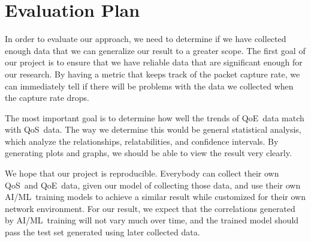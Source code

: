 \section{Evaluation Plan}\label{evaluation}
    In order to evaluate our approach, we need to determine if we have collected enough data that we can generalize our result to a greater scope. The first goal of our project is to ensure that we have reliable data that are significant enough for our research. By having a metric that keeps track of the packet capture rate, we can immediately tell if there will be problems with the data we collected when the capture rate drops.

    The most important goal is to determine how well the trends of QoE~data match with QoS~data. The way we determine this would be general statistical analysis, which analyze the relationships, relatabilities, and confidence intervals. By generating plots and graphs, we should be able to view the result very clearly.

    We hope that our project is reproducible. Everybody can collect their own QoS~and QoE~data, given our model of collecting those data, and use their own AI/ML~training models to achieve a similar result while customized for their own network environment. For our result, we expect that the correlations generated by AI/ML~training will not vary much over time, and the trained model should pass the test set generated using later collected data.
